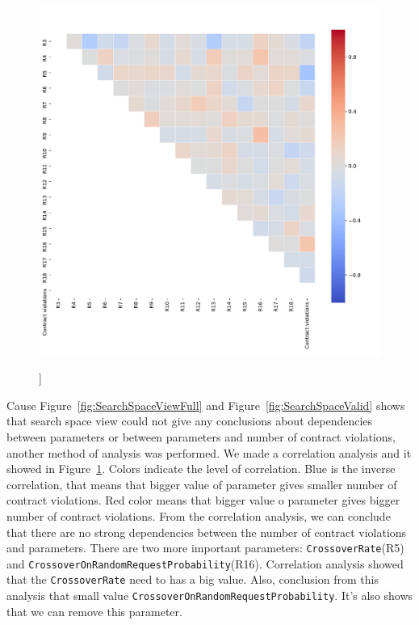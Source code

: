 \begin{figure}
	\centering
	\includegraphics[width=\textwidth]{images/CorrelationAnalysis.pdf}
	\caption[]]{}
	\label{fig:CorrelationAnalysis}
\end{figure}

Cause Figure~\ref{fig:SearchSpaceViewFull} and Figure~\ref{fig:SearchSpaceValid} shows that search space view could not give any conclusions about dependencies between parameters or between parameters and number of contract violations, another method of analysis was performed.
We made a correlation analysis and it showed in Figure~\ref{fig:CorrelationAnalysis}. Colors indicate the level of correlation. Blue is the inverse correlation, that means that bigger value of parameter gives smaller number of contract violations. Red color means that bigger value o parameter gives bigger number of contract violations.
From the correlation analysis, we can conclude that there are no strong dependencies between the number of contract violations and parameters. There are two more important parameters: \texttt{CrossoverRate}(R5) and \texttt{CrossoverOnRandomRequestProbability}(R16).
Correlation analysis showed that the \texttt{CrossoverRate} need to has a big value. Also, conclusion from this analysis that small value  \texttt{CrossoverOnRandomRequestProbability}. It's also shows that we can remove this parameter. 

